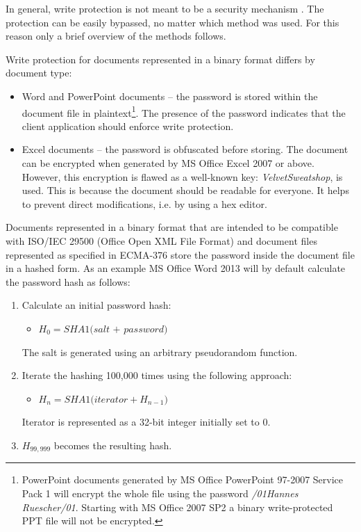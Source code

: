 \documentclass[11pt,oneside]{fithesis2}
\begin{document}
In general, write protection is not meant to be a security mechanism \cite[p. 94]{msoffcrypto}. The protection can be easily bypassed, no matter which method was used. For this reason only a brief overview of the methods follows.

Write protection for documents represented in a binary format differs by document type:

\begin{itemize}
\setlength\itemsep{0.1em}
	\item{Word and PowerPoint documents -- the password is stored within the document file in plaintext\footnote{PowerPoint documents generated by MS Office PowerPoint 97-2007 Service Pack 1 will encrypt the whole file using the password \textit{/01Hannes Ruescher/01}. Starting with MS Office 2007 SP2 a binary write-protected PPT file will not be encrypted.}. The presence of the password indicates that the client application should enforce write protection.}
	\item{Excel documents -- the password is obfuscated before storing. The document can be encrypted when generated by MS Office Excel 2007 or above. However, this encryption is flawed as a well-known key: \textit{VelvetSweatshop}, is used. This is because the document should be readable for everyone. It helps to prevent direct modifications, i.e. by using a hex editor.}
\end{itemize}

Documents represented in a binary format that are intended to be compatible with ISO/IEC 29500 (Office Open XML File Format) and document files represented as specified in ECMA-376 store the password inside the document file in a hashed form. As an example MS Office Word 2013 will by default calculate the password hash as follows:

\begin{enumerate}
\item{Calculate an initial password hash:}
	\begin{itemize}
		\item{$H_0 =\textit{SHA1(salt + password)}$}
	\end{itemize}
	The salt is generated using an arbitrary pseudorandom function.
\item{Iterate the hashing 100,000 times using the following approach:}
	\begin{itemize}
		\item{$H_n = \textit{SHA1(iterator}+ H_{n-1})$}
	\end{itemize}
	Iterator is represented as a 32-bit integer initially set to 0.
\item{$H_{99,999}$ becomes the resulting hash.}
\end{enumerate}
\end{document}
